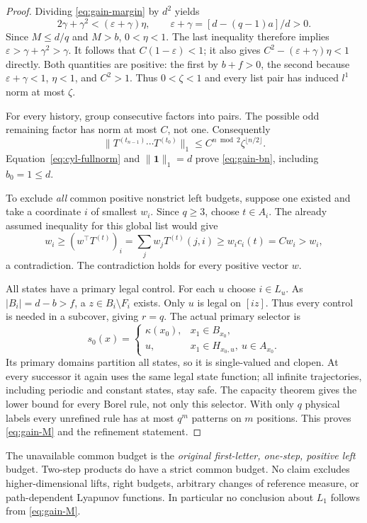 \documentclass[11pt,reqno]{amsart}
\numberwithin{equation}{section}
\theoremstyle{definition}
\newcommand{\one}{\mathbf 1}
\newcommand{\eps}{\varepsilon}
\begin{document}
\begin{proof}
Dividing \eqref{eq:gain-margin} by $d^2$ yields
\[
 2\gamma+\gamma^2<(\eps+\gamma)\eta,
 \qquad\eps+\gamma=[d-(q-1)a]/d>0.
\]
Since $M\le d/q$ and $M>b$, $0<\eta<1$. The last inequality
therefore implies $\eps>\gamma+\gamma^2>\gamma$.
It follows that $C(1-\eps)<1$; it also gives
$C^2-(\eps+\gamma)\eta<1$ directly. Both quantities are positive:
the first by $b+f>0$, the second because
$\eps+\gamma<1$, $\eta<1$, and $C^2>1$.
Thus $0<\zeta<1$ and every list pair has induced $l^1$ norm
at most $\zeta$.

For every history, group consecutive factors into pairs. The possible
odd remaining factor has norm at most $C$, not one. Consequently
\[
 \|T^{(t_{n-1})}\cdots T^{(t_0)}\|_1
 \le C^{n\bmod2}\zeta^{\lfloor n/2\rfloor}.
\]
Equation~\eqref{eq:cyl-fullnorm} and $\|\one\|_1=d$ prove
\eqref{eq:gain-bn}, including $b_0=1\le d$.

To exclude \emph{all} common positive nonstrict left budgets,
suppose one existed and take a coordinate $i$ of smallest $w_i$.
Since $q\ge3$, choose $t\in A_i$. The already assumed
inequality for this global list would give
\[
 w_i\ge(w^\top T^{(t)})_i
 =\sum_jw_jT^{(t)}(j,i)\ge w_i c_i(t)=Cw_i>w_i,
\]
a contradiction. The contradiction holds for every positive vector $w$.

All states have a primary legal control. For each $u$ choose
$i\in L_u$. As $|B_i|=d-b>f$, a $z\in B_i\setminus F_i$
exists. Only $u$ is legal on $[iz]$. Thus every control is needed
in a subcover, giving $r=q$.
The actual primary selector is
\begin{equation}\label{eq:gain-selector}
 s_0(x)=\begin{cases}
 \kappa(x_0),&x_1\in B_{x_0},\\
 u,&x_1\in H_{x_0,u},\ u\in A_{x_0}.
 \end{cases}
\end{equation}
Its primary domains partition all states, so it is single-valued
and clopen. At every successor it again uses the same legal state
function; all infinite trajectories, including periodic and constant
states, stay safe. The capacity theorem gives the lower bound for
every Borel rule, not only this selector. With only $q$ physical
labels every unrefined rule has at most $q^m$ patterns on $m$
positions. This proves \eqref{eq:gain-M} and the refinement statement.
\end{proof}

The unavailable common budget is the \emph{original first-letter,
one-step, positive left} budget. Two-step products do have a strict
common budget. No claim excludes higher-dimensional lifts, right
budgets, arbitrary changes of reference measure, or path-dependent
Lyapunov functions. In particular no conclusion about $L_1$ follows
from \eqref{eq:gain-M}.
\end{document}
